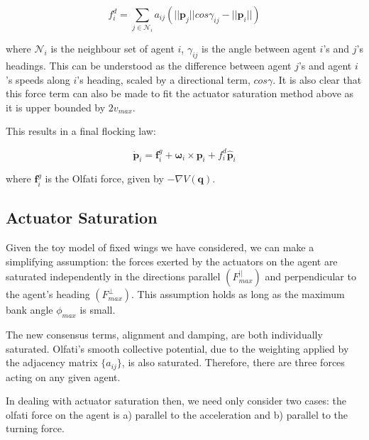 \documentclass[letterpaper, 10 pt, conference]{ieeeconf}  %
\begin{document}
\begin{equation}
    f_i^d = \sum_{j \in \mathcal{N}_i} a_{ij}(||\mathbf{p}_j||cos\gamma_{ij} - ||\mathbf{p}_i||)
\end{equation}

where $\mathcal{N}_i$ is the neighbour set of agent $i$, $\gamma_{ij}$ is the angle between agent $i$'s and $j$'s headings. This can be understood as the difference between agent $j$'s and agent $i$'s speeds along $i$'s heading, scaled by a directional term, $cos\gamma$. It is also clear that this force term can also be made to fit the actuator saturation method above as it is upper bounded by $2v_{max}$. 

This results in a final flocking law:

\begin{equation}
        \dot{\mathbf{p}}_i = \mathbf{f}_i^g + \boldsymbol{\omega}_i\times\mathbf{p}_i + f_i^d \hat{\mathbf{p}}_i
\end{equation}

where $\mathbf{f}_i^g$ is the Olfati force, given by $-\nabla V(\mathbf{q})$.

\subsection{Actuator Saturation}

Given the toy model of fixed wings we have considered, we can make a simplifying assumption: the forces exerted by the actuators on the agent are saturated independently in the directions parallel $(F^{||}_{max})$ and perpendicular to the agent's heading $(F^{\perp}_{max})$. This assumption holds as long as the maximum bank angle $\phi_{max}$ is small. 

The new consensus terms, alignment and damping, are both individually saturated. Olfati's smooth collective potential, due to the weighting applied by the adjacency matrix $\{a_{ij}\}$, is also saturated. Therefore, there are three forces acting on any given agent. 

In dealing with actuator saturation then, we need only consider two cases: the olfati force on the agent is a) parallel to the acceleration and b) parallel to the turning force.  
\end{document}
